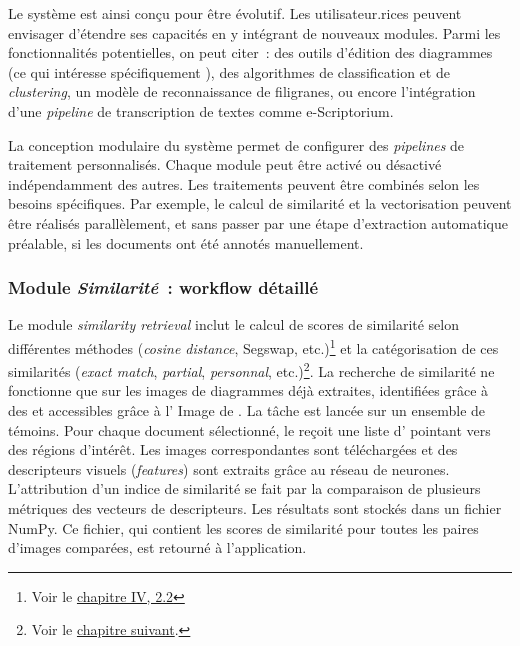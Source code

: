 
Le système est ainsi conçu pour être évolutif. Les utilisateur.rices peuvent
envisager d'étendre ses capacités en y intégrant de nouveaux modules.
Parmi les fonctionnalités potentielles, on peut citer~: des outils
d'édition des diagrammes (ce qui intéresse spécifiquement \eida), des
algorithmes de classification et de \textit{clustering}, un modèle de
reconnaissance de filigranes, ou encore l'intégration d'une \textit{pipeline} de
transcription de textes comme e-Scriptorium.

La conception modulaire du système permet de configurer des \textit{pipelines} de
traitement personnalisés. Chaque module peut être activé ou désactivé
indépendamment des autres. Les traitements peuvent être combinés selon
les besoins spécifiques. Par exemple, le calcul de similarité et la
vectorisation peuvent être réalisés parallèlement, et sans passer par
une étape d'extraction automatique préalable, si les documents ont été
annotés manuellement.

\hypertarget{module-similarite-workflow-detaille}{%
\subsubsection{\texorpdfstring{Module \emph{Similarité}~: workflow
détaillé}{Module Similarité~: workflow détaillé}}\label{module-similarite-workflow-detaille}}

Le module \textit{similarity retrieval} inclut le calcul de scores de
similarité selon différentes méthodes (\textit{cosine distance}, Segswap, etc.)\footnote{Voir le \hyperlink{similarite}{chapitre IV, 2.2}} et la catégorisation de ces similarités (\textit{exact match},
\textit{partial}, \textit{personnal}, etc.)\footnote{Voir le \hyperlink{chapitre-8-interfaces}{chapitre suivant}.}. La
recherche de similarité ne fonctionne que sur les images de diagrammes
déjà extraites, identifiées grâce à des \URLs et accessibles grâce à l'\api
Image de \iiif. La tâche est lancée sur un ensemble de témoins. Pour
chaque document sélectionné, le \gpu reçoit une liste d'\URLs \iiif
pointant vers des régions d'intérêt. Les images correspondantes sont
téléchargées et des descripteurs visuels (\emph{features}) sont extraits
grâce au réseau de neurones. L'attribution d'un indice de similarité se
fait par la comparaison de plusieurs métriques des vecteurs de
descripteurs. Les résultats sont stockés dans un fichier NumPy. Ce
fichier, qui contient les scores de similarité pour toutes les paires
d'images comparées, est retourné à l'application.


